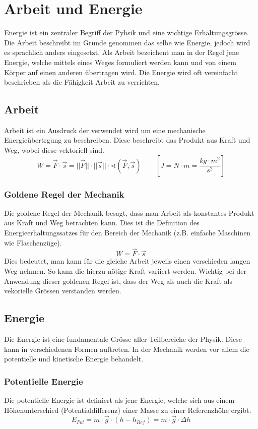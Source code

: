\chapter{Arbeit und Energie}

Energie ist ein zentraler Begriff der Pyhsik und eine wichtige 
Erhaltungsgrösse. Die Arbeit beschreibt im Grunde genommen das selbe wie 
Energie, jedoch wird es sprachlich anders eingesetzt. Als Arbeit 
bezeichent man in der Regel jene Energie, welche mittels eines Weges 
formuliert werden kann und von einem Körper auf einen anderen übertragen 
wird. Die Energie wird oft vereinfacht beschrieben als die Fähigkeit
Arbeit zu verrichten.

\newpage
\section{Arbeit}
Arbeit ist ein Ausdruck der verwendet wird um eine mechanische 
Energieübertrgung zu beschreiben. Diese beschreibt das Produkt aus
Kraft und Weg, wobei diese vektoriell sind.
\[ \boxed{ W = \vec{F} \cdot \vec{s} 
	= ||\vec{F}|| \cdot ||\vec{s}|| \cdot 
	\sphericalangle \left( \vec{F}, \vec{s} \right) } 
	\qquad \left[ J = N \cdot m = \frac{kg \cdot m^2}{s^2} \right] \]

\subsection{Goldene Regel der Mechanik}
Die goldene Regel der Mechanik besagt, dass man Arbeit als konstantes 
Produkt aus Kraft und Weg betrachten kann. Dies ist die Definition des
Energieerhaltungssatzes für den Bereich der Mechanik (z.B. einfache
Maschinen wie Flaschenzüge). 
\[ \boxed{W = \vec{F} \cdot \vec{s}} \] 
Dies bedeutet, man kann für die gleiche Arbeit jeweils einen verschieden
langen Weg nehmen. So kann die hierzu nötige Kraft variiert werden. 
Wichtig bei der Anwendung dieser goldenen Regel ist, dass der Weg als
auch die Kraft als vekorielle Grössen verstanden werden. 

\section{Energie}
Die Energie ist eine fundamentale Grösse aller Teilbereiche der Physik.
Diese kann in verschiedenen Formen auftreten. In der Mechanik werden vor
allem die potentielle und kinetische Energie behandelt.

\subsection{Potentielle Energie}
Die potentielle Energie ist definiert als jene Energie, welche sich aus
einem Höhenunterschied (Potentialdifferenz) einer Masse zu einer 
Referenzhöhe ergibt. 
\[ \boxed{ E_{Pot} 
	= m \cdot \vec{g} \cdot (h - h_{Ref})
	= m \cdot \vec{g} \cdot \Delta h 
} \]

